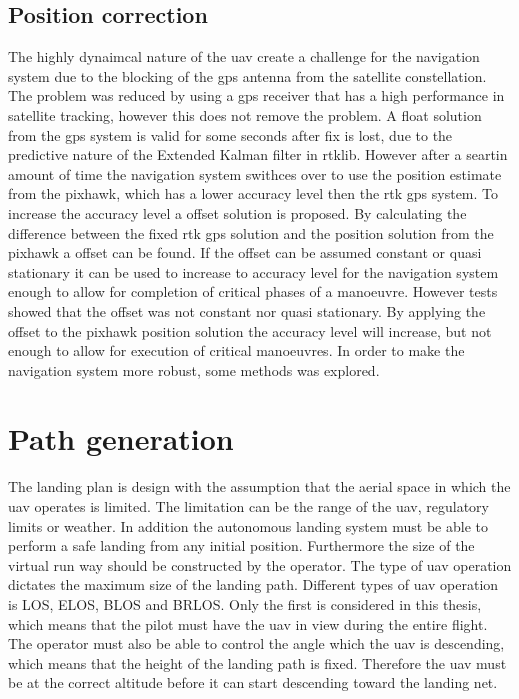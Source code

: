 \subsection{Position correction}%
The highly dynaimcal nature of the uav create a challenge for the navigation system due to the blocking of the gps antenna from the satellite constellation. The problem was reduced by using a gps receiver that has a high performance in satellite tracking, however this does not remove the problem. A float solution from the gps system is valid for some seconds after fix is lost, due to the predictive nature of the Extended Kalman filter in rtklib. However after a seartin amount of time the navigation system swithces over to use the position estimate from the pixhawk, which has a lower accuracy level then the rtk gps system. To increase the accuracy level a offset solution is proposed. By calculating the difference between the fixed rtk gps solution and the position solution from the pixhawk a offset can be found. If the offset can be assumed constant or quasi stationary it can be used to increase to accuracy level for the navigation system enough to allow for completion of critical phases of a manoeuvre. However tests showed that the offset was not constant nor quasi stationary. By applying the offset to the pixhawk position solution the accuracy level will increase, but not enough to allow for execution of critical manoeuvres.
In order to make the navigation system more robust, some methods was explored. 
\section{Path generation}
The landing plan is design with the assumption that the aerial space in which the uav operates is limited. The limitation can be the range of the uav, regulatory limits or weather. In addition the autonomous landing system must be able to perform a safe landing from any initial position. Furthermore the size of the virtual run way should be constructed by the operator. The type of uav operation dictates the maximum size of the landing path. Different types of uav operation is LOS, ELOS, BLOS and BRLOS. Only the first is considered in this thesis, which means that the pilot must have the uav in view during the entire flight. The operator must also be able to control the angle which the uav is descending, which means that the height of the landing path is fixed. Therefore the uav must be at the correct altitude before it can start descending toward the landing net.


